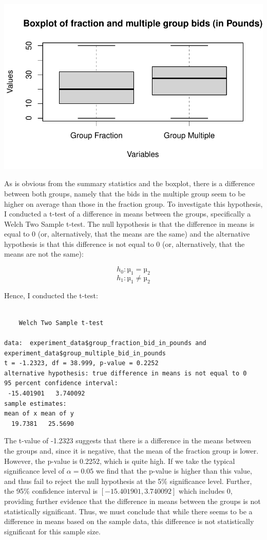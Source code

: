 \documentclass[
]{report}
\begin{document}
\includegraphics{paper_files/figure-pdf/unnamed-chunk-2-1.pdf}

As is obvious from the summary statistics and the boxplot, there is a
difference between both groups, namely that the bids in the multiple
group seem to be higher on average than those in the fraction group. To
investigate this hypothesis, I conducted a t-test of a difference in
means between the groups, specifically a Welch Two Sample t-test. The
null hypothesis is that the difference in means is equal to 0 (or,
alternatively, that the means are the same) and the alternative
hypothesis is that this difference is not equal to 0 (or, alternatively,
that the means are not the same):

\[h_0: µ_1 = µ_2\] \[h_1: µ_1 ≠ µ_2\]

Hence, I conducted the t-test:

\begin{verbatim}

    Welch Two Sample t-test

data:  experiment_data$group_fraction_bid_in_pounds and experiment_data$group_multiple_bid_in_pounds
t = -1.2323, df = 38.999, p-value = 0.2252
alternative hypothesis: true difference in means is not equal to 0
95 percent confidence interval:
 -15.401901   3.740092
sample estimates:
mean of x mean of y 
  19.7381   25.5690 
\end{verbatim}

The t-value of -1.2323 suggests that there is a difference in the means
between the groups and, since it is negative, that the mean of the
fraction group is lower. However, the p-value is 0.2252, which is quite
high. If we take the typical significance level of \(α = 0.05\) we find
that the p-value is higher than this value, and thus fail to reject the
null hypothesis at the 5\% significance level. Further, the 95\%
confidence interval is \([-15.401901, 3.740092]\) which includes 0,
providing further evidence that the difference in means between the
groups is not statistically significant. Thus, we must conclude that
while there seems to be a difference in means based on the sample data,
this difference is not statistically significant for this sample size.
\end{document}
